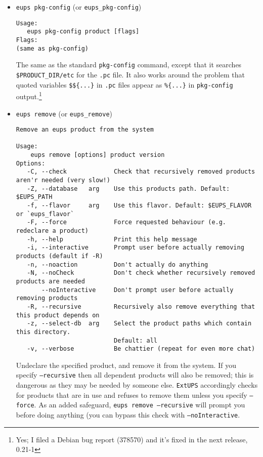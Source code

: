 \documentclass{article}
\newcommand{\code}[1]{\texttt{#1}}
\newcommand{\eups}{\code{ExtUPS}}
\begin{document}
\begin{itemize}

\item \code{eups pkg-config} (or \code{eups\_pkg-config})
\begin{verbatim}
Usage:
   eups pkg-config product [flags]
Flags:
(same as pkg-config)
\end{verbatim}

The same as the standard \code{pkg-config} command, except that it
searches \code{\$PRODUCT\_DIR/etc} for the \code{.pc} file.  It also
works around the problem that quoted variables \code{\$\$\{...\}}
in \code{.pc} files appear as \code{\%\{...\}} in \code{pkg-config} output.\footnote{
  Yes; I filed a Debian bug report (378570) and it's fixed in the next release, 0.21-1}
  

\item \code{eups remove} (or \code{eups\_remove})
\begin{verbatim}
Remove an eups product from the system

Usage:
    eups remove [options] product version
Options:
   -C, --check             Check that recursively removed products aren'r needed (very slow!)
   -Z, --database   arg    Use this products path. Default: $EUPS_PATH
   -f, --flavor     arg    Use this flavor. Default: $EUPS_FLAVOR or `eups_flavor`
   -F, --force             Force requested behaviour (e.g. redeclare a product)
   -h, --help              Print this help message
   -i, --interactive       Prompt user before actually removing products (default if -R)
   -n, --noaction          Don't actually do anything
   -N, --noCheck           Don't check whether recursively removed products are needed
       --noInteractive     Don't prompt user before actually removing products
   -R, --recursive         Recursively also remove everything that this product depends on
   -z, --select-db  arg    Select the product paths which contain this directory.
                           Default: all
   -v, --verbose           Be chattier (repeat for even more chat)
\end{verbatim}

Undeclare the specified product, and remove it from the system. If you specify
\code{--recursive} then all dependent products will also be removed; this is dangerous
as they may be needed by someone else. \eups{} accordingly checks for products
that are in use and refuses to remove them unless you specify \code{--force}.  As
an added safeguard, \code{eups remove --recursive} will prompt you before doing anything
(you can bypass this check with \code{--noInteractive}.


\end{itemize}
\end{document}
